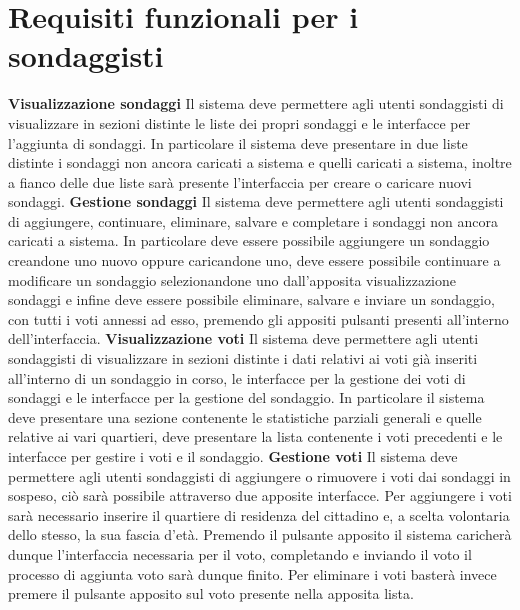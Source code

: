     \section{Requisiti funzionali per i sondaggisti}
        \begin{rfList}
            \rfItem \textbf{Visualizzazione sondaggi} Il sistema deve permettere agli utenti sondaggisti di visualizzare in sezioni distinte le liste dei propri sondaggi e le interfacce per l'aggiunta di sondaggi. In particolare il sistema deve presentare in due liste distinte i sondaggi non ancora caricati a sistema e quelli caricati a sistema, inoltre a fianco delle due liste sarà presente l'interfaccia per creare o caricare nuovi sondaggi.
            \rfItem \textbf{Gestione sondaggi} Il sistema deve permettere agli utenti sondaggisti di aggiungere, continuare, eliminare, salvare e completare i sondaggi non ancora caricati a sistema. In particolare deve essere possibile aggiungere un sondaggio creandone uno nuovo oppure caricandone uno, deve essere possibile continuare a modificare un sondaggio selezionandone uno dall'apposita visualizzazione sondaggi e infine deve essere possibile eliminare, salvare e inviare un sondaggio, con tutti i voti annessi ad esso, premendo gli appositi pulsanti presenti all'interno dell'interfaccia.
            \rfItem \textbf{Visualizzazione voti} Il sistema deve permettere agli utenti sondaggisti di visualizzare in sezioni distinte i dati relativi ai voti già inseriti all'interno di un sondaggio in corso, le interfacce per la gestione dei voti di sondaggi e le interfacce per la gestione del sondaggio. In particolare il sistema deve presentare una sezione contenente le statistiche parziali generali e quelle relative ai vari quartieri, deve presentare la lista contenente i voti precedenti e le interfacce per gestire i voti e il sondaggio.
            \rfItem \textbf{Gestione voti} Il sistema deve permettere agli utenti sondaggisti di aggiungere o rimuovere i voti dai sondaggi in sospeso, ciò sarà possibile attraverso due apposite interfacce. Per aggiungere i voti sarà necessario inserire il quartiere di residenza del cittadino e, a scelta volontaria dello stesso, la sua fascia d'età. Premendo il pulsante apposito il sistema caricherà dunque l'interfaccia necessaria per il voto, completando e inviando il voto il processo di aggiunta voto sarà dunque finito. Per eliminare i voti basterà invece premere il pulsante apposito sul voto presente nella apposita lista.
        \end{rfList}
